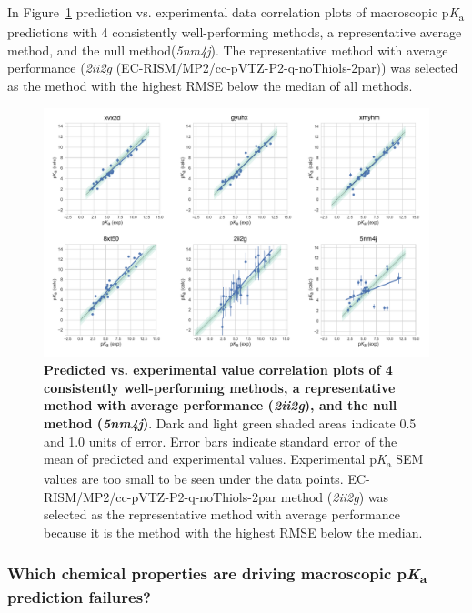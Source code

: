 \documentclass[9pt,lineno,final]{elife}
\newcommand{\pKa}{p\textit{K}\textsubscript{a}}
\begin{document}
In Figure~\ref{fig:typeIII_pred_vs_exp_correlation} prediction vs. experimental data correlation plots of macroscopic \pKa{} predictions with 4 consistently well-performing methods, a representative average method, and the null method(\textit{5nm4j}). The representative method with average performance (\textit{2ii2g} (EC-RISM/MP2/cc-pVTZ-P2-q-noThiols-2par)) was selected as the method with the highest RMSE below the median of all methods.

\begin{figure}[h]
\centering
\includegraphics[width=1.0\linewidth]{figures/typeIII-pred-vs-exp-correlation-fig.pdf}
\caption{{\bf Predicted vs. experimental value correlation plots of 4 consistently well-performing methods, a representative method with average performance (\textit{2ii2g}), and the null method (\textit{5nm4j})}. 
Dark and light green shaded areas indicate 0.5 and 1.0 units of error. Error bars indicate standard error of the mean of predicted and experimental values. Experimental \pKa{} SEM values are too small to be seen under the data points. EC-RISM/MP2/cc-pVTZ-P2-q-noThiols-2par method (\textit{2ii2g}) was selected as the representative method with average performance because it is the method with the highest RMSE below the median.
}
\label{fig:typeIII_pred_vs_exp_correlation}
\end{figure}



\subsubsection{Which chemical properties are driving macroscopic \pKa{} prediction failures?}
\end{document}
